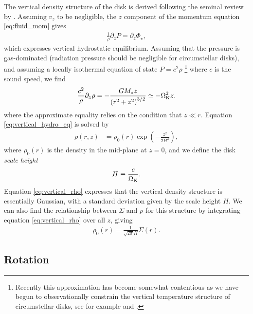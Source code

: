 The vertical density structure of the disk is derived following the seminal review by \citet{pringle1981}.
Assuming $v_z$ to be negligible, the $z$ component of the momentum equation \ref{eq:fluid_mom} gives
\begin{align}
    \frac{1}{\rho} \partial_z P = \partial_z \Phi_\star,
\end{align}
which expresses vertical hydrostatic equilibrium.
Assuming that the pressure is gas-dominated (radiation pressure should be negligible for circumstellar disks), and assuming a locally isothermal equation of state $P=c^2 \rho$ \footnote[1]{Recently this approximation has become somewhat contentious as we have begun to observationally constrain the vertical temperature structure of circumstellar disks, see for example \citet{pinte2018} and \citet{calahan2021}.} where $c$ is the sound speed, we find 
\begin{align}
    \frac{c^2}{\rho} \partial_z \rho = - \frac{G M_\star z}{\left(r^2 + z^2\right)^{3/2}} \simeq - \Omega_{\rm K}^2 z. \label{eq:vertical_hydro_eq}
\end{align}
where the approximate equality relies on the condition that $z \ll r$.
Equation \ref{eq:vertical_hydro_eq} is solved by
\begin{align}
    \rho(r,z) &= \rho_0(r) \exp{\left( -\frac{z^2}{2 H^2} \right)}, \label{eq:vertical_rho}
\end{align}
where $\rho_0(r)$ is the density in the mid-plane at $z=0$, and we define the disk \textit{scale height}
\begin{align}
    H \equiv\frac{c}{\Omega_{\rm K}}.
\end{align}
Equation \ref{eq:vertical_rho} expresses that the vertical density structure is essentially Gaussian, with a standard deviation given by the scale height $H$.
We can also find the relationship between $\Sigma$ and $\rho$ for this structure by integrating equation \ref{eq:vertical_rho} over all $z$, giving
\begin{align}
    \rho_0(r) = \frac{1}{\sqrt{2\pi} H} \Sigma(r). \label{eq:surf_dens_to_dens}
\end{align}

\subsection{Rotation}

